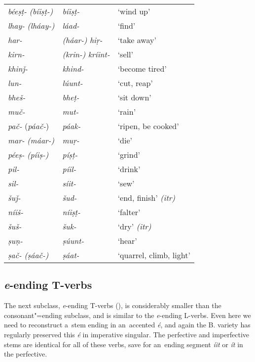 \begin{table}[H]
\begin{tabularx}{\textwidth}{ l@{\hspace{40pt}} l@{\hspace{40pt}} Q }
\textit{béeṣṭ-} \textit{(bíiṣṭ-)} &
\textit{bíiṣṭ-}	&
`wind up' \\
\textit{lhay-} \textit{(lháay-)}	&
\textit{láad-}	&
`find' \\
\textit{har-} &
\textit{(háar-)}	\textit{hiṛ-}	&
`take away' \\
\textit{kirn-} &
\textit{(krin-)} \textit{kríint-}	&
`sell' \\
\textit{khinǰ-}&
\textit{khind-}	&
`become tired' \\
\textit{lun-} &
\textit{lúunt-}	&
`cut, reap' \\
\textit{bheš-} &
\textit{bheṭ-}	&
`sit down' \\
\textit{muč-} &
\textit{mut-}	&
`rain' \\
\textit{\textit{pač-}} (\textit{páač-})	&
\textit{páak-}	&
`ripen, be cooked' \\
\textit{mar-} \textit{(máar-)}&
\textit{muṛ-}	&
`die' \\
\textit{péeṣ-} \textit{(píiṣ-)} &
\textit{píṣṭ-}	&
`grind' \\
\textit{pil-} &\textit{píil-}	&
`drink' \\
\textit{sil-} &\textit{síit-}	&
`sew' \\
\textit{šuǰ-} &\textit{šud-}	&
`end, finish' \textit{(itr)}\\
\textit{níiš-} &\textit{níiṣṭ-}	&
`falter' \\
\textit{šuš-} &\textit{šuk-}	&
`dry'  \textit{(itr)} \\
\textit{ṣuṇ-} &\textit{ṣúunt-}	&
`hear' \\
\textit{ṣač-} \textit{(ṣáač-)} &	\textit{ṣáat-}	&
`quarrel, climb, light' \\
\end{tabularx}
\end{table}

\subsection{\textit{e}-ending T-verbs}
\label{subsec:8-3-6}


The next subclass, \textit{e}-ending T-verbs (), is considerably smaller than the consonant"=ending subclass, and is similar to the \textit{e}-ending L-verbs. Even here we need to reconstruct a~stem ending in an~accented \textit{é}, and again the B. variety has regularly preserved this \textit{é} in imperative singular. The perfective and imperfective stems are identical for all of these verbs, save for an~ending segment \textit{íit} or \textit{ít} in the perfective.


